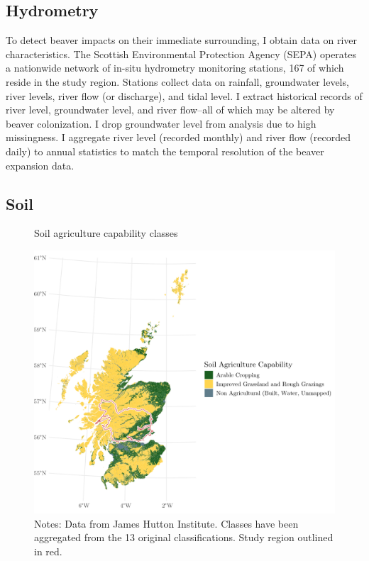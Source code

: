\subsection{Hydrometry}
To detect beaver impacts on their immediate surrounding, I obtain data on river characteristics. The Scottish Environmental Protection Agency (SEPA) operates a nationwide network of in-situ hydrometry monitoring stations, 167 of which reside in the study region. Stations collect data on rainfall, groundwater levels, river levels, river flow (or discharge), and tidal level. I extract historical records of river level, groundwater level, and river flow--all of which may be altered by beaver colonization. I drop groundwater level from analysis due to high missingness. I aggregate river level (recorded monthly) and river flow (recorded daily) to annual statistics to match the temporal resolution of the beaver expansion data.

\subsection{Soil}

\begin{figure}
    \centering
    \caption{Soil agriculture capability classes}
    \includegraphics[width=0.6\linewidth]{output/figures/soil_lca_map.png}
    \caption*{\justifying \footnotesize Notes: Data from James Hutton Institute. Classes have been aggregated from the 13 original classifications. Study region outlined in red.}
    \label{fig:soil-lca-map}
\end{figure}


